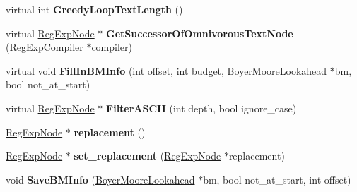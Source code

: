 \begin{DoxyCompactItemize}
\item 
\hypertarget{classv8_1_1internal_1_1_reg_exp_node_aa7f55d54a0ffe45d303773b96ac5ef68}{}virtual int {\bfseries Greedy\+Loop\+Text\+Length} ()\label{classv8_1_1internal_1_1_reg_exp_node_aa7f55d54a0ffe45d303773b96ac5ef68}

\item 
\hypertarget{classv8_1_1internal_1_1_reg_exp_node_a3e648c04dbac6ee8045e8aeeafeb905e}{}virtual \hyperlink{classv8_1_1internal_1_1_reg_exp_node}{Reg\+Exp\+Node} $\ast$ {\bfseries Get\+Successor\+Of\+Omnivorous\+Text\+Node} (\hyperlink{classv8_1_1internal_1_1_reg_exp_compiler}{Reg\+Exp\+Compiler} $\ast$compiler)\label{classv8_1_1internal_1_1_reg_exp_node_a3e648c04dbac6ee8045e8aeeafeb905e}

\item 
\hypertarget{classv8_1_1internal_1_1_reg_exp_node_a9aa7d0545dcc3fc50a5581a01bc9ad30}{}virtual void {\bfseries Fill\+In\+B\+M\+Info} (int offset, int budget, \hyperlink{classv8_1_1internal_1_1_boyer_moore_lookahead}{Boyer\+Moore\+Lookahead} $\ast$bm, bool not\+\_\+at\+\_\+start)\label{classv8_1_1internal_1_1_reg_exp_node_a9aa7d0545dcc3fc50a5581a01bc9ad30}

\item 
\hypertarget{classv8_1_1internal_1_1_reg_exp_node_abd1059b3fc1fcc23c95e30e91d393422}{}virtual \hyperlink{classv8_1_1internal_1_1_reg_exp_node}{Reg\+Exp\+Node} $\ast$ {\bfseries Filter\+A\+S\+C\+I\+I} (int depth, bool ignore\+\_\+case)\label{classv8_1_1internal_1_1_reg_exp_node_abd1059b3fc1fcc23c95e30e91d393422}

\item 
\hypertarget{classv8_1_1internal_1_1_reg_exp_node_a5106a9e3526079e16cc999ba4bbadad1}{}\hyperlink{classv8_1_1internal_1_1_reg_exp_node}{Reg\+Exp\+Node} $\ast$ {\bfseries replacement} ()\label{classv8_1_1internal_1_1_reg_exp_node_a5106a9e3526079e16cc999ba4bbadad1}

\item 
\hypertarget{classv8_1_1internal_1_1_reg_exp_node_abe1b803364b2e377ec428bc9920c94ca}{}\hyperlink{classv8_1_1internal_1_1_reg_exp_node}{Reg\+Exp\+Node} $\ast$ {\bfseries set\+\_\+replacement} (\hyperlink{classv8_1_1internal_1_1_reg_exp_node}{Reg\+Exp\+Node} $\ast$replacement)\label{classv8_1_1internal_1_1_reg_exp_node_abe1b803364b2e377ec428bc9920c94ca}

\item 
\hypertarget{classv8_1_1internal_1_1_reg_exp_node_a6267579804303b6f30263d6470949ffe}{}void {\bfseries Save\+B\+M\+Info} (\hyperlink{classv8_1_1internal_1_1_boyer_moore_lookahead}{Boyer\+Moore\+Lookahead} $\ast$bm, bool not\+\_\+at\+\_\+start, int offset)\label{classv8_1_1internal_1_1_reg_exp_node_a6267579804303b6f30263d6470949ffe}


\end{DoxyCompactItemize}
